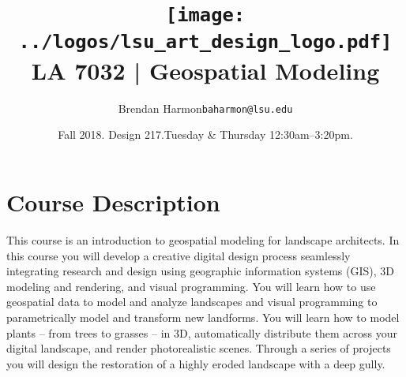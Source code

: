 \documentclass[11pt,article,oneside]{memoir}
\makeatletter
\def\myauthor{Author}
\def\mytitle{Title}
\def\myemail{baharmon@lsu.edu}
\def\myauthor{Brendan Harmon}
\def\mytitle{ \texttt{[image: ../logos/lsu\_art\_design\_logo.pdf]} \\[0.1cm] {\normalfont \normalsize LA 7032 |} \Large Geospatial Modeling}
\newcommand{\globalcolor}[1]{%
  \color{#1}\global\let\default@color\current@color
}
\makeatother
\begin{document}
\setlength\bibitemsep{0.5em}

\setmainfont[Scale=1, Path = ../fonts/lato/,BoldItalicFont=Lato-RegIta,BoldFont=Lato-Reg,ItalicFont=Lato-LigIta]{Lato-Lig}
\setsansfont[Scale=1, Path = ../fonts/lato/,BoldItalicFont=Lato-RegIta,BoldFont=Lato-Reg,ItalicFont=Lato-LigIta]{Lato-Lig}
\setmonofont[Mapping=tex-text,Scale=0.8,Path = ../fonts/inconsolata/]{i}

\def\ind{\hangindent=1 true cm\hangafter=1 \noindent}
\def\labelitemi{$\cdot$}

\title{\LARGE \mytitle}
\author{\Large\myauthor \newline \footnotesize\texttt{\noindent\myemail}}
\date{Fall 2018. Design 217.\newline Tuesday \& Thursday 12:30am--3:20pm.}
\published{\,}


\globalcolor{black}
\vspace*{-10em}
\maketitle
{}
\clearpage



\globalcolor{black}

\vspace*{-10em}
\maketitle

\section{Course Description}

This course is an introduction to 
geospatial modeling for landscape architects.
In this course you will develop a creative digital design process
seamlessly integrating research and design
using geographic information systems (GIS),
3D modeling and rendering, and
visual programming.
You will learn how to use geospatial data
to model and analyze landscapes
and visual programming to
parametrically model and transform new landforms.
You will learn how to model plants -- from trees to grasses -- in 3D,
automatically distribute them across your digital landscape,
and render photorealistic scenes.
Through a series of projects you will design the restoration 
of a highly eroded landscape with a deep gully.\\
\end{document}
